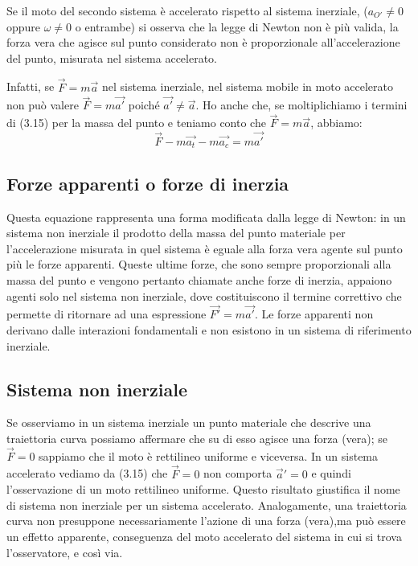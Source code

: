 \documentclass[class=book, crop=false, oneside, 12pt]{standalone}
\begin{document}
Se il moto del secondo sistema è accelerato rispetto al sistema inerziale, (\(a_{O'} \neq 0\) oppure \(\omega \neq 0\) o entrambe) si osserva che la legge di Newton non è più valida, la forza vera che agisce sul punto considerato non è proporzionale all'accelerazione del punto, misurata nel sistema accelerato.

Infatti, se \(\overrightarrow{F} = m \overrightarrow{a}\) nel sistema inerziale, nel sistema mobile in moto accelerato non può valere \(\overrightarrow{F} = m \overrightarrow{a'}\) poiché \( \overrightarrow{a'} \neq \overrightarrow{a}\).
Ho anche che, se moltiplichiamo i termini di (3.15) per la massa del punto e teniamo conto che \(\overrightarrow{F} = m \overrightarrow{a}\), abbiamo:
\begin{equation}
    \overrightarrow{F} - m \overrightarrow{a_t} - m \overrightarrow{a_c} = m \overrightarrow{a'}
\end{equation}

\subsection{Forze apparenti o forze di inerzia}
Questa equazione rappresenta una forma modificata dalla legge di Newton: in un sistema non inerziale il prodotto della massa del punto materiale per l'accelerazione misurata in quel sistema è eguale alla forza vera agente sul punto più le forze apparenti. 
Queste ultime forze, che sono sempre proporzionali alla massa del punto e vengono pertanto chiamate anche forze di inerzia, appaiono agenti solo nel sistema non inerziale, dove costituiscono il termine correttivo che permette di ritornare ad una espressione \(\overrightarrow{F'} = m \overrightarrow{a'}\).
Le forze apparenti non derivano dalle interazioni fondamentali e non esistono in un sistema di riferimento inerziale.

\subsection{Sistema non inerziale}

Se osserviamo in un sistema inerziale un punto materiale che descrive una traiettoria curva possiamo affermare che su di esso agisce una forza (vera); se \(\overrightarrow{F} = 0\) sappiamo che il moto è rettilineo uniforme e viceversa.\newline
In un sistema accelerato vediamo da (3.15) che \(\overrightarrow{F} = 0\) non comporta \(\overrightarrow{a}' = 0\) e quindi l'osservazione di un moto rettilineo uniforme. 
Questo risultato giustifica il nome di sistema non inerziale per un sistema accelerato. 
Analogamente, una traiettoria curva non presuppone necessariamente l'azione di una forza (vera),ma può essere un effetto apparente, conseguenza del moto accelerato del sistema in cui si trova l'osservatore, e così via.
\end{document}
